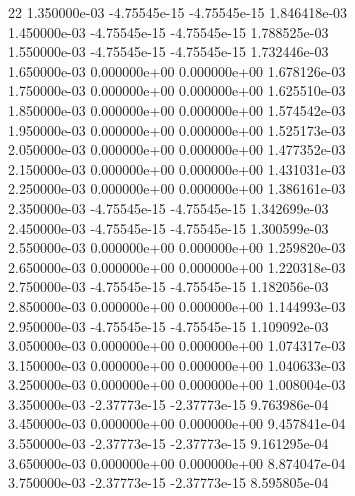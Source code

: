 22	1.350000e-03	-4.75545e-15	-4.75545e-15	1.846418e-03	\\ 	1.450000e-03	-4.75545e-15	-4.75545e-15	1.788525e-03	\\ 	1.550000e-03	-4.75545e-15	-4.75545e-15	1.732446e-03	\\ 	1.650000e-03	0.000000e+00	0.000000e+00	1.678126e-03	\\ 	1.750000e-03	0.000000e+00	0.000000e+00	1.625510e-03	\\ 	1.850000e-03	0.000000e+00	0.000000e+00	1.574542e-03	\\ 	1.950000e-03	0.000000e+00	0.000000e+00	1.525173e-03	\\ 	2.050000e-03	0.000000e+00	0.000000e+00	1.477352e-03	\\ 	2.150000e-03	0.000000e+00	0.000000e+00	1.431031e-03	\\ 	2.250000e-03	0.000000e+00	0.000000e+00	1.386161e-03	\\ 	2.350000e-03	-4.75545e-15	-4.75545e-15	1.342699e-03	\\ 	2.450000e-03	-4.75545e-15	-4.75545e-15	1.300599e-03	\\ 	2.550000e-03	0.000000e+00	0.000000e+00	1.259820e-03	\\ 	2.650000e-03	0.000000e+00	0.000000e+00	1.220318e-03	\\ 	2.750000e-03	-4.75545e-15	-4.75545e-15	1.182056e-03	\\ 	2.850000e-03	0.000000e+00	0.000000e+00	1.144993e-03	\\ 	2.950000e-03	-4.75545e-15	-4.75545e-15	1.109092e-03	\\ 	3.050000e-03	0.000000e+00	0.000000e+00	1.074317e-03	\\ 	3.150000e-03	0.000000e+00	0.000000e+00	1.040633e-03	\\ 	3.250000e-03	0.000000e+00	0.000000e+00	1.008004e-03	\\ 	3.350000e-03	-2.37773e-15	-2.37773e-15	9.763986e-04	\\ 	3.450000e-03	0.000000e+00	0.000000e+00	9.457841e-04	\\ 	3.550000e-03	-2.37773e-15	-2.37773e-15	9.161295e-04	\\ 	3.650000e-03	0.000000e+00	0.000000e+00	8.874047e-04	\\ 	3.750000e-03	-2.37773e-15	-2.37773e-15	8.595805e-04	\\ \hline
